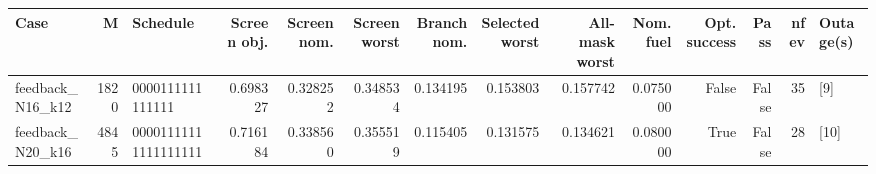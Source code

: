\begin{tabular}{lrlrrrrrrrrrrl}
\toprule
Case & M & Schedule & Screen obj. & Screen nom. & Screen worst & Branch nom. & Selected worst & All-mask worst & Nom. fuel & Opt. success & Pass & nfev & Outage(s) \\
\midrule
feedback\_N16\_k12 & 1820 & 0000111111111111 & 0.698327 & 0.328252 & 0.348534 & 0.134195 & 0.153803 & 0.157742 & 0.075000 & False & False & 35 & [9] \\
feedback\_N20\_k16 & 4845 & 00001111111111111111 & 0.716184 & 0.338560 & 0.355519 & 0.115405 & 0.131575 & 0.134621 & 0.080000 & True & False & 28 & [10] \\
\bottomrule
\end{tabular}
